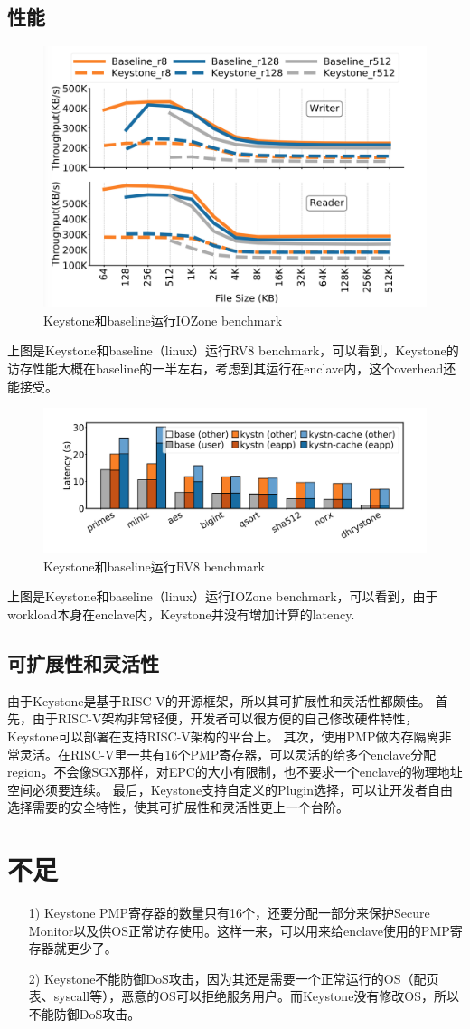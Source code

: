 \subsection{性能}
\begin{figure}[]
    \centering
    \includegraphics[width=1\textwidth]{memory-eval.png}    
    \caption{Keystone和baseline运行IOZone benchmark}
\end{figure}
上图是Keystone和baseline（linux）运行RV8 benchmark，可以看到，Keystone的访存性能大概在baseline的一半左右，考虑到其运行在enclave内，这个overhead还能接受。
\begin{figure}[]
    \centering
    \includegraphics[width=1\textwidth]{calculation-eval.png}    
    \caption{Keystone和baseline运行RV8 benchmark}
\end{figure}
上图是Keystone和baseline（linux）运行IOZone benchmark，可以看到，由于workload本身在enclave内，Keystone并没有增加计算的latency.
\subsection{可扩展性和灵活性}
由于Keystone是基于RISC-V的开源框架，所以其可扩展性和灵活性都颇佳。
首先，由于RISC-V架构非常轻便，开发者可以很方便的自己修改硬件特性，Keystone可以部署在支持RISC-V架构的平台上。
其次，使用PMP做内存隔离非常灵活。在RISC-V里一共有16个PMP寄存器，可以灵活的给多个enclave分配region。不会像SGX那样，对EPC的大小有限制，也不要求一个enclave的物理地址空间必须要连续。
最后，Keystone支持自定义的Plugin选择，可以让开发者自由选择需要的安全特性，使其可扩展性和灵活性更上一个台阶。

\section{不足}
\begin{itemize}
	\item [1)]
	Keystone PMP寄存器的数量只有16个，还要分配一部分来保护Secure Monitor以及供OS正常访存使用。这样一来，可以用来给enclave使用的PMP寄存器就更少了。
	\item [2)]
	Keystone不能防御DoS攻击，因为其还是需要一个正常运行的OS（配页表、syscall等），恶意的OS可以拒绝服务用户。而Keystone没有修改OS，所以不能防御DoS攻击。
\end{itemize}